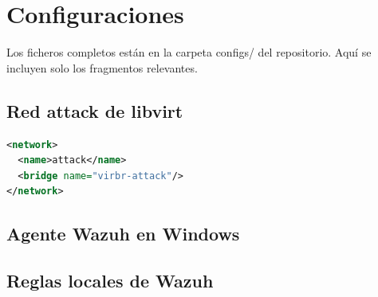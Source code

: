 \chapter{Configuraciones}\label{anx:configuraciones}

Los ficheros completos están en la carpeta configs/ del repositorio.
Aquí se incluyen solo los fragmentos relevantes.

\section{Red attack de libvirt}
\begin{nota}
\begin{lstlisting}[language=XML]
<network>
  <name>attack</name>
  <bridge name="virbr-attack"/>
</network>
\end{lstlisting}
\end{nota}


\section{Agente Wazuh en Windows}

\section{Reglas locales de Wazuh}
